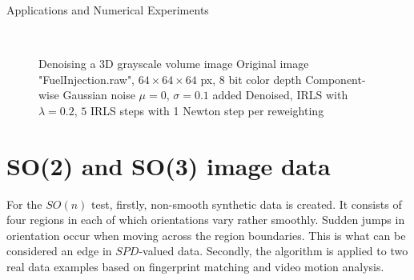 \begin{chapter}{Applications and Numerical Experiments}
\begin{figure}[h!]
    \centering
    \\
    \caption[Denoising 3D Grayscale Volume Data IRLS]{Denoising a 3D grayscale volume image
	 Original image "FuelInjection.raw", $64\times 64 \times 64$ px, 8 bit color depth
	 Component-wise Gaussian noise $\mu=0$, $\sigma=0.1$ added
	 Denoised, IRLS with $\lambda=0.2$, $5$ IRLS steps with 1 Newton step per reweighting
	\label{fig:application_volume2}
    }
\end{figure}









\FloatBarrier
\section{SO(2) and SO(3) image data} %
\label{sec:SO image data}
For the $SO(n)$ test, firstly, non-smooth synthetic data is created. It consists of 
four regions in each of which orientations vary rather smoothly. Sudden jumps
in orientation occur when moving across the region boundaries. This is what can be
considered an edge in $SPD$-valued data. Secondly, the algorithm is applied to two 
real data examples based on fingerprint matching and video motion analysis.


\end{chapter}
